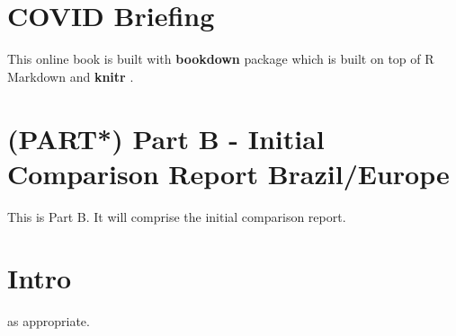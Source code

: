 \documentclass[
]{book}
\begin{document}
\hypertarget{covid-briefing}{%
\chapter{COVID Briefing}\label{covid-briefing}}

This online book is built with \textbf{bookdown} package \citep{R-bookdown} which is built on top of R Markdown and \textbf{knitr} \citep{xie2015}.

\hypertarget{partB}{%
\chapter*{\texorpdfstring{(PART*) Part B - Initial Comparison Report Brazil/Europe}{(PART*) Part B - Initial Comparison Report   Brazil/Europe}}\label{partB}}

This is Part B. It will comprise the initial comparison report.

\hypertarget{intro}{%
\chapter{Intro}\label{intro}}

as appropriate.

  
\end{document}
